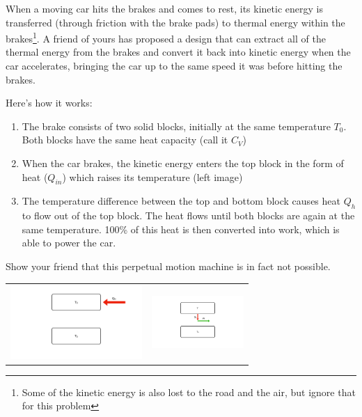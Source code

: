 
\question When a moving car hits the brakes and comes to rest, its kinetic energy is transferred (through friction with the brake pads) to thermal energy within the brakes\footnote{Some of the kinetic energy is also lost to the road and the air, but ignore that for this problem}. A friend of yours has proposed a design that can extract all of the thermal energy from the brakes and convert it back into kinetic energy when the car accelerates, bringing the car up to the same speed it was before hitting the brakes.

Here's how it works:
\begin{enumerate}
	\item The brake consists of two solid blocks, initially at the same temperature $T_0$. Both blocks have the same heat capacity (call it $C_V$)
	\item When the car brakes, the kinetic energy enters the top block in the form of heat ($Q_{in}$) which raises its temperature (left image)
	\item The temperature difference between the top and bottom block causes heat $Q_h$ to flow out of the top block. The heat flows until both blocks are again at the same temperature. 100\% of this heat is then converted into work, which is able to power the car.
\end{enumerate}
Show your friend that this perpetual motion machine is in fact not possible.
\begin{center}
\begin{tabular}{c|c}
		\includegraphics[width=5cm]{heat_bath1.pdf}&	\includegraphics[width=3.5cm]{heat_bath2.pdf}\\
\end{tabular}
\end{center}


